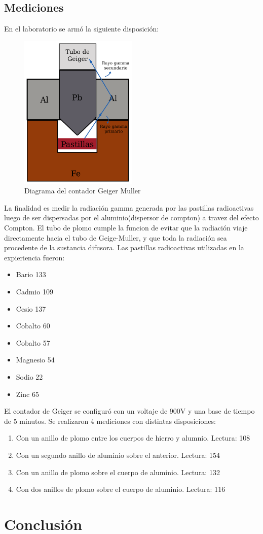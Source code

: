 \documentclass[a4paper,12pt]{report}
\begin{document}
  \section{Mediciones}
    En el laboratorio se armó la siguiente disposición:
    \begin{figure}[h]
        \centering
        \includegraphics[width=0.5\textwidth]{images/diagrama.png}
        \caption{Diagrama del contador Geiger Muller}
        \label{fig:etiqueta}
    \end{figure}

    La finalidad es medir la radiación gamma generada por las pastillas radioactivas luego de ser dispersadas por el aluminio(dispersor de compton)
    a travez del efecto Compton. El tubo de plomo cumple la funcion de evitar que la radiación viaje directamente hacia el tubo de Geige-Muller, y
    que toda la radiación sea procedente de la sustancia difusora.
    Las pastillas radioactivas utilizadas en la expieriencia fueron:
    \begin{itemize}
        \item Bario 133
        \item Cadmio 109
        \item Cesio 137
        \item Cobalto 60
        \item Cobalto 57
        \item Magnesio 54
        \item Sodio 22
        \item Zinc 65
    \end{itemize}
    El contador de Geiger se configuró con un voltaje de 900V y una base de tiempo de 5 minutos.
    Se realizaron 4 mediciones con distintas disposiciones:
    \begin{enumerate}
        \item Con un anillo de plomo entre los cuerpos de hierro y alumnio. Lectura: 108
        \item Con un segundo anillo de aluminio sobre el anterior. Lectura: 154
        \item Con un anillo de plomo sobre el cuerpo de aluminio. Lectura: 132
        \item Con dos anillos de plomo sobre el cuerpo de aluminio. Lectura: 116
    \end{enumerate}
\chapter{Conclusión}
\end{document}
